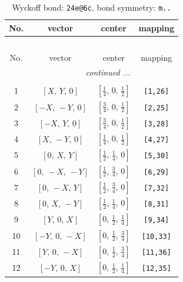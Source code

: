 \documentclass[fleqn,8pt]{jsarticle}
\begin{document}
\begin{longtable}{cccc}
\caption{Wyckoff bond: {\tt 24e@6c}, bond symmetry: {\tt m..}}
 \\
 \hline \hline
No. & vector & center & mapping \\ \hline \endfirsthead

\multicolumn{3}{l}{\tablename\ \thetable{}} \\
 \hline \hline
No. & vector & center & mapping \\ \hline \endhead

 \hline \hline
\multicolumn{3}{r}{\footnotesize\it continued ...} \\ \endfoot

 \hline \hline
\multicolumn{3}{r}{} \\ \endlastfoot

1 & $\left[ X,\, Y,\, 0 \right]$ & $\left[ \frac{1}{4},\, 0,\, \frac{1}{2} \right]$ & {\tt [1,26]} \\ \hline
2 & $\left[ - X,\, - Y,\, 0 \right]$ & $\left[ \frac{3}{4},\, 0,\, \frac{1}{2} \right]$ & {\tt [2,25]} \\ \hline
3 & $\left[ - X,\, Y,\, 0 \right]$ & $\left[ \frac{3}{4},\, 0,\, \frac{1}{2} \right]$ & {\tt [3,28]} \\ \hline
4 & $\left[ X,\, - Y,\, 0 \right]$ & $\left[ \frac{1}{4},\, 0,\, \frac{1}{2} \right]$ & {\tt [4,27]} \\ \hline
5 & $\left[ 0,\, X,\, Y \right]$ & $\left[ \frac{1}{2},\, \frac{1}{4},\, 0 \right]$ & {\tt [5,30]} \\ \hline
6 & $\left[ 0,\, - X,\, - Y \right]$ & $\left[ \frac{1}{2},\, \frac{3}{4},\, 0 \right]$ & {\tt [6,29]} \\ \hline
7 & $\left[ 0,\, - X,\, Y \right]$ & $\left[ \frac{1}{2},\, \frac{3}{4},\, 0 \right]$ & {\tt [7,32]} \\ \hline
8 & $\left[ 0,\, X,\, - Y \right]$ & $\left[ \frac{1}{2},\, \frac{1}{4},\, 0 \right]$ & {\tt [8,31]} \\ \hline
9 & $\left[ Y,\, 0,\, X \right]$ & $\left[ 0,\, \frac{1}{2},\, \frac{1}{4} \right]$ & {\tt [9,34]} \\ \hline
10 & $\left[ - Y,\, 0,\, - X \right]$ & $\left[ 0,\, \frac{1}{2},\, \frac{3}{4} \right]$ & {\tt [10,33]} \\ \hline
11 & $\left[ Y,\, 0,\, - X \right]$ & $\left[ 0,\, \frac{1}{2},\, \frac{3}{4} \right]$ & {\tt [11,36]} \\ \hline
12 & $\left[ - Y,\, 0,\, X \right]$ & $\left[ 0,\, \frac{1}{2},\, \frac{1}{4} \right]$ & {\tt [12,35]} \\ \hline

\end{longtable}
\end{document}
